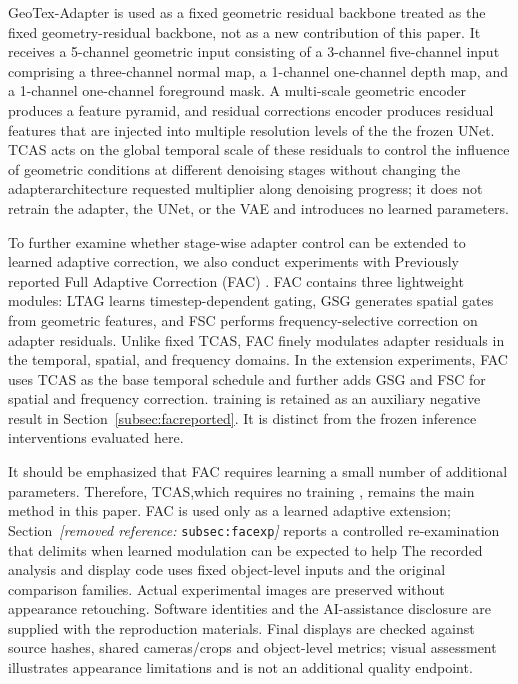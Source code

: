 \documentclass[times,twocolumn,final]{elsarticle}
\providecommand{\DIFadd}[1]{{\protect\color{blue} \sf #1}} %
\providecommand{\DIFdel}[1]{{\protect\color{red} \scriptsize #1}} %
\providecommand{\DIFaddbegin}{} %
\providecommand{\DIFaddend}{} %
\providecommand{\DIFdelbegin}{} %
\providecommand{\DIFdelend}{} %
\begin{document}
\DIFaddend GeoTex-Adapter is \DIFdelbegin \DIFdel{used as a fixed geometric residual backbone}\DIFdelend \DIFaddbegin \DIFadd{treated as the fixed geometry-residual backbone, not as a new contribution of this paper}\DIFaddend . It receives a \DIFdelbegin \DIFdel{5-channel geometric input consisting of a 3-channel }\DIFdelend \DIFaddbegin \DIFadd{five-channel input comprising a three-channel }\DIFaddend normal map, a \DIFdelbegin \DIFdel{1-channel }\DIFdelend \DIFaddbegin \DIFadd{one-channel }\DIFaddend depth map, and a \DIFdelbegin \DIFdel{1-channel }\DIFdelend \DIFaddbegin \DIFadd{one-channel }\DIFaddend foreground mask. A multi-scale \DIFdelbegin \DIFdel{geometric encoder produces a feature pyramid, and residual corrections }\DIFdelend \DIFaddbegin \DIFadd{encoder produces residual features that }\DIFaddend are injected into \DIFdelbegin \DIFdel{multiple resolution levels of the }\DIFdelend \DIFaddbegin \DIFadd{the frozen }\DIFaddend UNet. TCAS acts on the \DIFdelbegin \DIFdel{global temporal scale of these residuals to control the influence of geometric conditions at different denoising stages without changing the adapterarchitecture}\DIFdelend \DIFaddbegin \DIFadd{requested multiplier along denoising progress; it does not retrain the adapter, the UNet, or the VAE and introduces no learned parameters}\DIFaddend .

\DIFdelbegin \DIFdel{To further examine whether stage-wise adapter control can be extended to learned adaptive correction, we also conduct experiments with }\DIFdelend \DIFaddbegin \DIFadd{Previously reported }\DIFaddend Full Adaptive Correction (FAC) \DIFdelbegin \DIFdel{. FAC contains three lightweight modules: LTAG learns timestep-dependent gating, GSG generates spatial gates from geometric features, and FSC performs frequency-selective correction on adapter residuals.
Unlike fixed TCAS, FAC finely modulates adapter residuals in the temporal, spatial, and frequency domains. In the extension experiments, FAC uses TCAS as the base temporal schedule and further adds GSG and FSC for spatial and frequency correction.
}\DIFdelend \DIFaddbegin \DIFadd{training is retained as an auxiliary negative result in Section~\ref{subsec:facreported}. It is distinct from the frozen inference interventions evaluated here.
}\DIFaddend 

\DIFdelbegin \DIFdel{It should be emphasized that FAC requires learning a small number of additional parameters. Therefore, TCAS,which requires no training , remains the main method in this paper. FAC is used only as a learned adaptive extension; Section~\textit{[removed reference: }\texttt{subsec:facexp}\textit{]} reports a controlled re-examination that delimits when learned modulation can be expected to help}\DIFdelend \DIFaddbegin \DIFadd{The recorded analysis and display code uses fixed object-level inputs and the original comparison families. Actual experimental images are preserved without appearance retouching. Software identities and the AI-assistance disclosure are supplied with the reproduction materials. Final displays are checked against source hashes, shared cameras/crops and object-level metrics; visual assessment illustrates appearance limitations and is not an additional quality endpoint}\DIFaddend .
\end{document}
